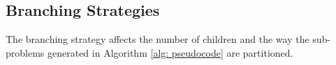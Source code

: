 \subsection{Branching Strategies}
	The branching strategy affects the number of children and the way the sub-problems generated in Algorithm \ref{alg: pseudocode} are partitioned. 